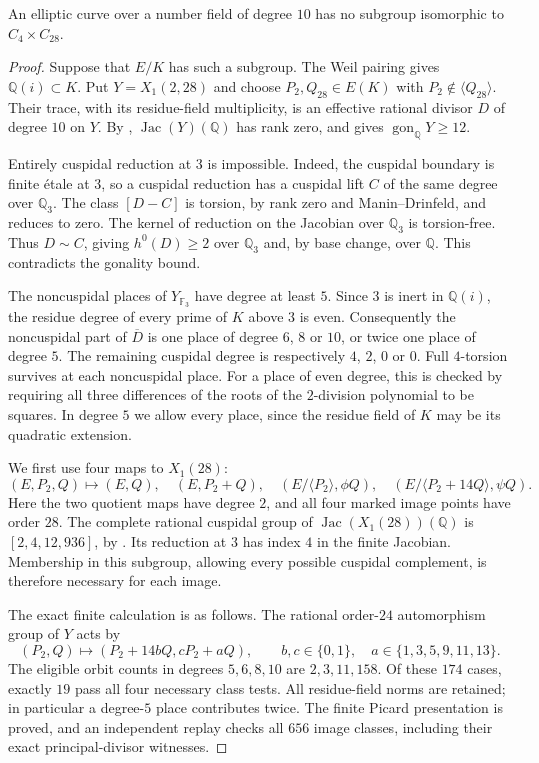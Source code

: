 \begin{proposition}\label{prop:decic-no428}
An elliptic curve over a number field of degree $10$ has no
subgroup isomorphic to $C_4\times C_{28}$.
\end{proposition}
\begin{proof}
Suppose that $E/K$ has such a subgroup. The Weil pairing gives
$\mathbb Q(i)\subset K$. Put $Y=X_1(2,28)$ and choose
$P_2,Q_{28}\in E(K)$ with $P_2\notin\langle Q_{28}\rangle$.
Their trace, with its residue-field multiplicity, is an effective
rational divisor $D$ of degree $10$ on $Y$.
By \cite[Theorem~3.1]{DEHMZ}, $\operatorname{Jac}(Y)(\mathbb Q)$
has rank zero, and \cite[Table~1]{NV} gives
$\operatorname{gon}_{\mathbb Q}Y\geq12$.

Entirely cuspidal reduction at $3$ is impossible.
Indeed, the cuspidal boundary is finite \'etale at $3$, so a
cuspidal reduction has a cuspidal lift $C$ of the same degree
over $\mathbb Q_3$. The class $[D-C]$ is torsion, by rank zero
and Manin--Drinfeld, and reduces to zero. The kernel of
reduction on the Jacobian over $\mathbb Q_3$ is torsion-free.
Thus $D\sim C$, giving $h^0(D)\geq2$ over $\mathbb Q_3$ and,
by base change, over $\mathbb Q$. This contradicts the gonality
bound.

The noncuspidal places of $Y_{\mathbb F_3}$ have degree at
least $5$. Since $3$ is inert in $\mathbb Q(i)$, the residue
degree of every prime of $K$ above $3$ is even. Consequently
the noncuspidal part of $\overline D$ is one place of degree
$6$, $8$ or $10$, or twice one place of degree $5$.
The remaining cuspidal degree is respectively $4$, $2$, $0$
or $0$. Full $4$-torsion survives at each noncuspidal place.
For a place of even degree, this is checked by requiring all
three differences of the roots of the $2$-division polynomial
to be squares. In degree $5$ we allow every place, since the
residue field of $K$ may be its quadratic extension.

We first use four maps to $X_1(28)$:
\[
 (E,P_2,Q)\longmapsto(E,Q),\quad(E,P_2+Q),\quad
 (E/\langle P_2\rangle,\phi Q),\quad
 (E/\langle P_2+14Q\rangle,\psi Q).
\]
Here the two quotient maps have degree $2$, and all four
marked image points have order $28$.
The complete rational cuspidal group of
$\operatorname{Jac}(X_1(28))(\mathbb Q)$ is
$[2,4,12,936]$, by \cite[Theorem~4.13]{DEHMZ}.
Its reduction at $3$ has index $4$ in the finite Jacobian.
Membership in this subgroup, allowing every possible
cuspidal complement, is therefore necessary for each image.

The exact finite calculation is as follows. The rational
order-$24$ automorphism group of $Y$ acts by
\[
 (P_2,Q)\longmapsto(P_2+14bQ,cP_2+aQ),
 \qquad b,c\in\{0,1\},\quad
 a\in\{1,3,5,9,11,13\}.
\]
The eligible orbit counts in degrees $5,6,8,10$ are
$2,3,11,158$. Of these $174$ cases, exactly $19$ pass all
four necessary class tests. All residue-field norms are
retained; in particular a degree-$5$ place contributes twice.
The finite Picard presentation is proved, and an independent
replay checks all $656$ image classes, including their exact
principal-divisor witnesses.


\end{proof}
